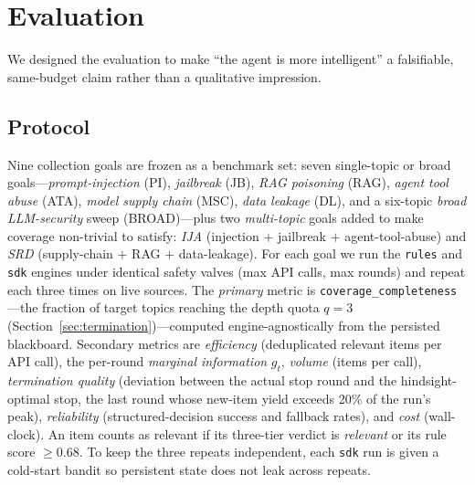 \documentclass[conference]{IEEEtran}
\newcommand{\code}[1]{\texttt{\small #1}}
\begin{document}
\section{Evaluation}
\label{sec:eval}

We designed the evaluation to make ``the agent is more intelligent'' a falsifiable, same-budget claim rather than a qualitative impression.

\subsection{Protocol}

Nine collection goals are frozen as a benchmark set: seven single-topic or broad goals---\emph{prompt-injection} (PI), \emph{jailbreak} (JB), \emph{RAG poisoning} (RAG), \emph{agent tool abuse} (ATA), \emph{model supply chain} (MSC), \emph{data leakage} (DL), and a six-topic \emph{broad LLM-security} sweep (BROAD)---plus two \emph{multi-topic} goals added to make coverage non-trivial to satisfy: \emph{IJA} (injection $+$ jailbreak $+$ agent-tool-abuse) and \emph{SRD} (supply-chain $+$ RAG $+$ data-leakage). For each goal we run the \code{rules} and \code{sdk} engines under identical safety valves (max API calls, max rounds) and repeat each three times on live sources. The \emph{primary} metric is \code{coverage\_completeness}---the fraction of target topics reaching the depth quota $q=3$ (Section~\ref{sec:termination})---computed engine-agnostically from the persisted blackboard. Secondary metrics are \emph{efficiency} (deduplicated relevant items per API call), the per-round \emph{marginal information} $g_t$, \emph{volume} (items per call), \emph{termination quality} (deviation between the actual stop round and the hindsight-optimal stop, the last round whose new-item yield exceeds 20\% of the run's peak), \emph{reliability} (structured-decision success and fallback rates), and \emph{cost} (wall-clock). An item counts as relevant if its three-tier verdict is \emph{relevant} or its rule score $\ge 0.68$. To keep the three repeats independent, each \code{sdk} run is given a cold-start bandit so persistent state does not leak across repeats.
\end{document}

